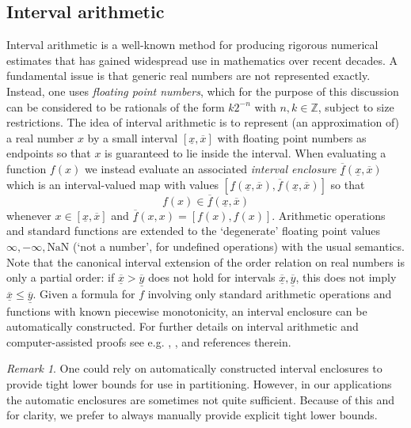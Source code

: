 \documentclass[12pt]{amsart}
\theoremstyle{plain}
\theoremstyle{definition}
\theoremstyle{remark}
\newtheorem{rem}[thm]{Remark}
\numberwithin{equation}{section}
\begin{document}
\subsection{Interval arithmetic}
Interval arithmetic is a well-known method for producing rigorous numerical estimates that has gained widespread use in mathematics over recent decades.
A fundamental issue is that generic real numbers are not represented exactly. Instead, one uses \emph{floating point numbers}, which for the purpose of this discussion can be considered to be rationals of the form $k 2^{-n}$ with $n,k\in\mathbb{Z}$, subject to size restrictions. 
The idea of interval arithmetic is to represent (an approximation of) a real number $x$ by a small interval $[\underline{x},\overline{x}]$ with floating point numbers as endpoints so that $x$ is guaranteed to lie inside the interval.
When evaluating a function $f(x)$ we instead evaluate an associated \emph{interval enclosure} $\underline{\overline{f}}(\underline{x},\overline{x})$ which is an interval-valued map with values $[\underline{f}(\underline{x},\overline{x}), \overline{f}(\underline{x},\overline{x})]$ 
so that
\[ f(x)\in \overline{\underline{f}}(\underline{x},\overline{x}) \]
whenever $x\in [\underline{x},\overline{x}]$ and  $\underline{\overline{f}}(x,x)=[f(x),f(x)]$. Arithmetic operations and standard functions are extended to the `degenerate' floating point values $\infty,-\infty,\text{NaN}$ (`not a number', for undefined operations) with the usual semantics. Note that the canonical interval extension of the order relation on real numbers is only a partial order: if $\underline{\overline{x}}>\underline{\overline{y}}$ does not hold for intervals $\underline{\overline{x}},\underline{\overline{y}}$, this does not imply $\underline{\overline{x}}\le \underline{\overline{y}}$. 
Given a formula for $f$ involving only standard arithmetic operations and functions with known piecewise monotonicity, an interval enclosure can be automatically constructed. For further details on interval arithmetic and computer-assisted proofs see e.g. \cite{Tuc11}, \cite{Rump}, \cite{GomezSerrano} and references therein.
\begin{rem}
One could rely on automatically constructed interval enclosures to provide tight lower bounds for use in partitioning. However, in our applications the automatic enclosures are sometimes not quite sufficient. Because of this and for clarity, we prefer to always manually provide explicit tight lower bounds.
\end{rem}
\end{document}
